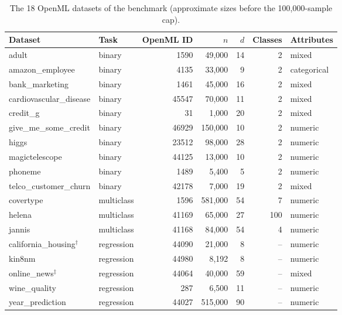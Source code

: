 \begin{table}[htb]
\centering
\caption[The 18 datasets of the benchmark]{The 18 OpenML datasets of
the benchmark (approximate sizes before the 100{,}000-sample cap).}
\label{tab:datasets}
\small
\begin{tabular}{llrrrrl}
\toprule
Dataset & Task & OpenML ID & $n$ & $d$ & Classes & Attributes \\
\midrule
adult                   & binary & 1590  & 49{,}000  & 14 & 2 & mixed \\
amazon\_employee        & binary & 4135  & 33{,}000  & 9  & 2 & categorical \\
bank\_marketing         & binary & 1461  & 45{,}000  & 16 & 2 & mixed \\
cardiovascular\_disease & binary & 45547 & 70{,}000  & 11 & 2 & mixed \\
credit\_g               & binary & 31    & 1{,}000   & 20 & 2 & mixed \\
give\_me\_some\_credit  & binary & 46929 & 150{,}000 & 10 & 2 & numeric \\
higgs                   & binary & 23512 & 98{,}000  & 28 & 2 & numeric \\
magictelescope          & binary & 44125 & 13{,}000  & 10 & 2 & numeric \\
phoneme                 & binary & 1489  & 5{,}400   & 5  & 2 & numeric \\
telco\_customer\_churn  & binary & 42178 & 7{,}000   & 19 & 2 & mixed \\
\midrule
covertype               & multiclass & 1596  & 581{,}000 & 54 & 7   & numeric \\
helena                  & multiclass & 41169 & 65{,}000  & 27 & 100 & numeric \\
jannis                  & multiclass & 41168 & 84{,}000  & 54 & 4   & numeric \\
\midrule
california\_housing$^{\dagger}$ & regression & 44090 & 21{,}000  & 8  & -- & numeric \\
kin8nm                  & regression & 44980 & 8{,}192   & 8  & -- & numeric \\
online\_news$^{\ddagger}$ & regression & 44064 & 40{,}000  & 59 & -- & mixed \\
wine\_quality           & regression & 287   & 6{,}500   & 11 & -- & numeric \\
year\_prediction        & regression & 44027 & 515{,}000 & 90 & -- & numeric \\
\bottomrule
\end{tabular}
\end{table}

